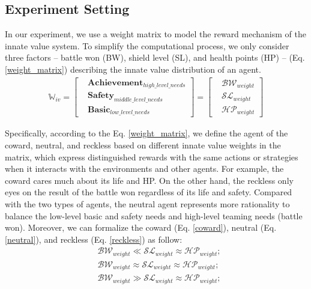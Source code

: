 \documentclass[letterpaper]{article} %
\begin{document}
\subsection{Experiment Setting}

In our experiment, we use a weight matrix to model the reward mechanism of the innate value system. To simplify the computational process, we only consider three factors -- battle won (BW), shield level (SL), and health points (HP) -- (Eq. \eqref{weight_matrix}) describing the innate value distribution of an agent.
\begin{equation}
\begin{split}
    \mathbb{W}_{iv} = \left [
    \begin{aligned}
    & \mathbf{Achievement}_{high\_level\_needs} \\
    & \mathbf{Safety}_{middle\_level\_needs} \\
    & \mathbf{Basic}_{low\_level\_needs}
    \end{aligned}
    \right ] =
    \left [
    \begin{aligned}
    & \mathcal{BW}_{weight} \\
    & \mathcal{SL}_{weight}  \\
    & \mathcal{HP}_{weight}
    \end{aligned}
    \right ]
\label{weight_matrix}
\end{split}
\end{equation}

Specifically, according to the Eq. \eqref{weight_matrix}, we define the agent of the coward, neutral, and reckless based on different innate value weights in the matrix, which express distinguished rewards with the same actions or strategies when it interacts with the environments and other agents. For example, the coward cares much about its life and HP. On the other hand, the reckless only eyes on the result of the battle won regardless of its life and safety. Compared with the two types of agents, the neutral agent represents more rationality to balance the low-level basic and safety needs and high-level teaming needs (battle won). Moreover, we can formalize the coward (Eq. \eqref{coward}), neutral (Eq. \eqref{neutral}), and reckless (Eq. \eqref{reckless}) as follow:
\begin{eqnarray}
    & \mathcal{BW}_{weight} \ll \mathcal{SL}_{weight} \approx \mathcal{HP}_{weight}; \label{coward} \\
    & \mathcal{BW}_{weight} \approx \mathcal{SL}_{weight} \approx \mathcal{HP}_{weight}; \label{neutral} \\
    & \mathcal{BW}_{weight} \gg \mathcal{SL}_{weight} \approx \mathcal{HP}_{weight}; \label{reckless}
\end{eqnarray}
\end{document}
